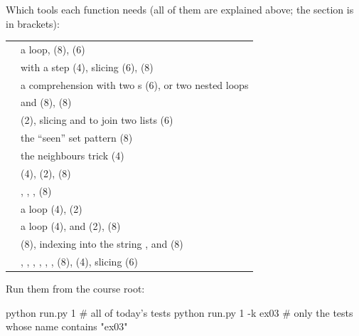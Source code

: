 \documentclass[10pt,a4paper]{article}
\begin{document}
Which tools each function needs (all of them are explained above; the section is in brackets):
\begin{datatable}{}{\footnotesize}
\begin{xltabular}{\linewidth}{@{}Y{0.43}Y{1.57}@{}}
 &  \\ \hline
\endhead
{} & a loop, \code{+=\allowbreak{}} (8),  (6) \\
 &  with a step (4), slicing (6),  (8) \\
 & a comprehension with two s (6), or two nested loops \\
 &  and  (8),  (8) \\
 & \code{\%} (2), slicing and \code{+} to join two lists (6) \\
 & the “seen” set pattern (8) \\
 & the  neighbours trick (4) \\
 &  (4), \code{\%} (2),  (8) \\
 & , , ,  (8) \\
 & a  loop (4), \code{\%} (2) \\
 & a  loop (4), \code{/\allowbreak{}/\allowbreak{}} and \code{\%} (2),  (8) \\
 &  (8), indexing into the string ,  and  (8) \\
 & , , , , , ,  (8),  (4), slicing (6) \\
\hline
\end{xltabular}
\end{datatable}
Run them from the course root:
\begin{shcode}
python run.py 1           # all of today's tests
python run.py 1 -k ex03   # only the tests whose name contains "ex03"
\end{shcode}
\end{document}
